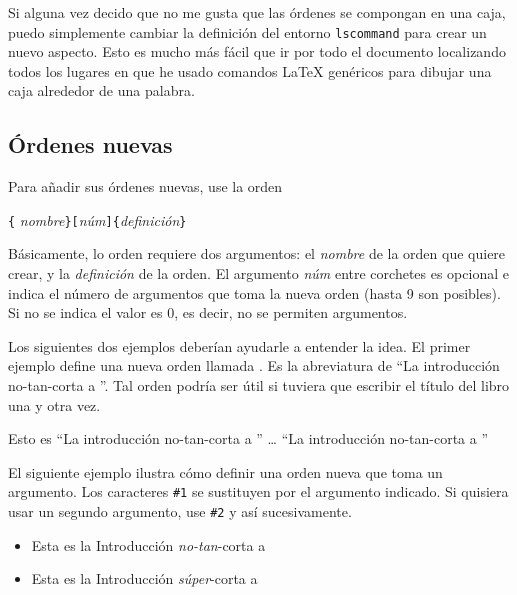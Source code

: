 Si alguna vez decido que no me gusta que las órdenes se compongan en una caja, puedo simplemente cambiar la definición del entorno \texttt{lscommand} para crear un nuevo aspecto.  Esto es mucho más fácil que ir por todo el documento localizando todos los lugares en que he usado comandos \LaTeX{} genéricos para dibujar una caja alrededor de una palabra.


\subsection{Órdenes nuevas}

Para añadir sus órdenes nuevas, use la orden
\begin{lscommand}
\verb|{|%
       \emph{nombre}\verb|}[|\emph{núm}\verb|]{|\emph{definición}\verb|}|
\end{lscommand}
Básicamente, lo orden requiere dos argumentos: el \emph{nombre} de la orden que quiere crear, y la \emph{definición} de la orden.  El argumento \emph{núm} entre corchetes es opcional e indica el número de argumentos que toma la nueva orden (hasta 9 son posibles).  Si no se indica el valor es 0, es decir, no se permiten argumentos.

Los siguientes dos ejemplos deberían ayudarle a entender la idea. El primer ejemplo define una nueva orden llamada .  Es la abreviatura de ``La introducción no-tan-corta a \LaTeXe''.  Tal orden podría ser útil si tuviera que escribir el título del libro una y otra vez.

\begin{example}
\newcommand{\intc}{La 
    introducción no-tan-corta a
    \LaTeXe}
Esto es ``\intc'' \ldots{} 
``\intc''
\end{example}

El siguiente ejemplo ilustra cómo definir una orden nueva que toma un argumento. Los caracteres \verb|#1| se sustituyen por el argumento indicado.  Si quisiera usar un segundo argumento, use \verb|#2| y así sucesivamente.

\begin{example}
\newcommand{\txsit}[1]
 {Esta es la Introducción
   \emph{#1}-corta a \LaTeXe}
\begin{itemize}
    \item \txsit{no-tan}
    \item \txsit{súper}
\end{itemize}
\end{example}

